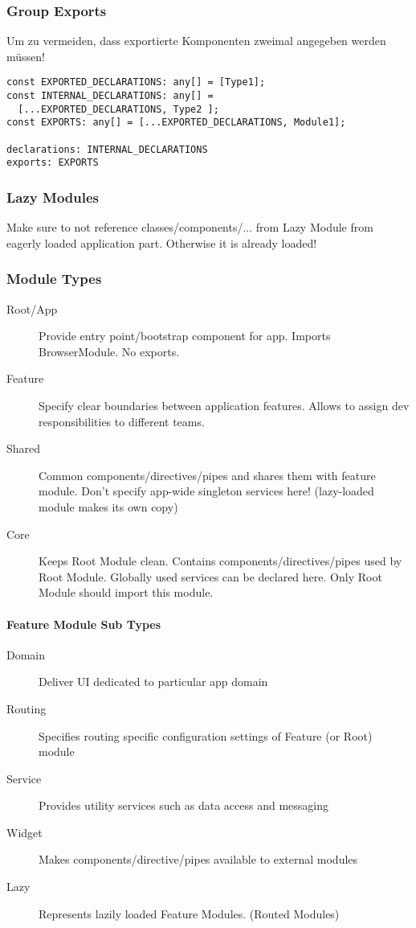 \begin{multicols*}{2}
\subsubsection{Group Exports}
Um zu vermeiden, dass exportierte Komponenten zweimal angegeben werden müssen!
\begin{verbatim}
const EXPORTED_DECLARATIONS: any[] = [Type1];
const INTERNAL_DECLARATIONS: any[] =
  [...EXPORTED_DECLARATIONS, Type2 ];
const EXPORTS: any[] = [...EXPORTED_DECLARATIONS, Module1];

declarations: INTERNAL_DECLARATIONS
exports: EXPORTS
\end{verbatim}

\subsubsection{Lazy Modules}
Make sure to not reference classes/components/... from Lazy Module from eagerly loaded application part. Otherwise it is already loaded!

\subsubsection{Module Types}
\begin{description}
    \item[Root/App] Provide entry point/bootstrap component for app. Imports BrowserModule. No exports.
    \item[Feature] Specify clear boundaries between application features. Allows to assign dev responsibilities to different teams.
    \item[Shared] Common components/directives/pipes and shares them with feature module. Don't specify app-wide singleton services here! (lazy-loaded module makes its own copy)
    \item[Core] Keeps Root Module clean. Contains components/directives/pipes used by Root Module. Globally used services can be declared here. Only Root Module should import this module.
\end{description}

\paragraph{Feature Module Sub Types}
\begin{description}
    \item[Domain] Deliver UI dedicated to particular app domain
    \item[Routing] Specifies routing specific configuration settings of Feature (or Root) module
    \item[Service] Provides utility services such as data access and messaging
    \item[Widget] Makes components/directive/pipes available to external modules
    \item[Lazy] Represents lazily loaded Feature Modules. (Routed Modules)
\end{description}


\end{multicols*}
